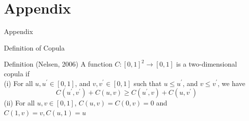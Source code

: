 \documentclass[aspectratio=1610, 9pt]{beamer}
\begin{document}




\appendix

\section{Appendix}

\begin{frame}
    \centering
    \Huge Appendix
\end{frame}

\begin{frame}{Definition of Copula} \label{def:copula}
    \begin{block}{Definition (Nelsen, 2006)} A function $C:[0,1]^2 \to [0,1]$ is a two-dimensional copula if \\
    (i) For all $u,u^\prime\in [0,1]$, and $v,v^\prime\in [0,1]$ such that $u\leq u^\prime$, and $v\leq v ^\prime$, we have 
    $$ C(u^\prime,v^\prime) + C(u,v) \geq C(u^\prime,v) + C(u,v^\prime) $$
    (ii) For all $u,v\in [0,1]$, $C(u,v)=C(0,v)=0$ and $C(1,v)=v,C(u,1)=u$
    \end{block}
    \vspace{0.6cm}
    \hyperlink{lemma:copula}{\beamerreturnbutton}
\end{frame}
\end{document}

